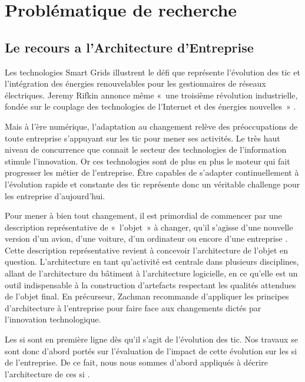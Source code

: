  
\section{Problématique de recherche}

\subsection{Le recours a l'Architecture d'Entreprise}

Les technologies Smart Grids illustrent le défi que représente l'évolution des 
\gls{tic} et l'intégration des énergies renouvelables pour les gestionnaires de 
réseaux électriques. Jeremy Rifkin annonce même «~une troisième révolution 
industrielle, fondée sur le couplage des technologies de l’Internet et des 
énergies nouvelles~» \cite{rifkin2012troisieme}. 

Mais à l'ère numérique, l'adaptation au changement relève des préoccupations de 
toute entreprise s'appuyant sur les \gls{tic} pour mener ses 
activités. Le très haut niveau de concurrence que connait le secteur des 
technologies de l'information stimule l'innovation. Or ces technologies sont de 
plus en plus le moteur qui fait progresser les  métier de l'entreprise. Être 
capables de s'adapter continuellement à l'évolution rapide et 
constante des \gls{tic} représente donc un véritable challenge pour les entreprise 
d'aujourd'hui.

Pour mener à bien tout changement, il est primordial de commencer par une 
description représentative de «~l'objet~» à changer, qu'il s'agisse d'une 
nouvelle version d'un avion, d'une voiture, d'un ordinateur ou encore d'une 
entreprise \cite{zachman1997enterprise}. Cette description représentative 
revient à concevoir l'architecture de l'objet en question. L'architecture en 
tant qu'activité est centrale dans plusieurs disciplines, allant de 
l'architecture du bâtiment à l'architecture logicielle, en ce qu'elle est un 
outil indispensable à la construction d'artefacts respectant les qualités 
attendues de l'objet final. En précurseur, Zachman \cite{zachman1997enterprise} 
recommande d'appliquer les principes d'architecture à l'entreprise pour faire 
face aux changements dictés par l'innovation technologique.

Les \gls{si} sont en première ligne dès qu'il s'agit de l'évolution des \gls{tic}. Nos 
travaux se sont donc d'abord portés sur l'évaluation de l'impact de cette 
évolution sur les \gls{si} de l'entreprise. De ce fait, nous nous sommes d'abord 
appliqués à décrire l'architecture de ces \gls{si} \cite{seghiri2015simulation}. 

